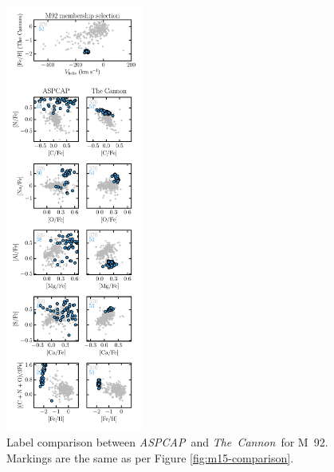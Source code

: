\documentclass[12pt,preprint]{aastex}
\newcommand{\project}[1]{\textsl{#1}}
\newcommand{\TheCannon}{\project{The~Cannon}}
\newcommand{\acronym}[1]{{\small{#1}}}
\newcommand{\aspcap}{\project{\acronym{ASPCAP}}}
\begin{document}
\begin{figure}[p]
\includegraphics[width=0.4\textwidth]{M92_comparison.pdf}
\caption{Label comparison between \aspcap\ and \TheCannon\ for M~92.
Markings are the same as per Figure \ref{fig:m15-comparison}.
\label{fig:m92-comparison}}
\end{figure}
\end{document}
